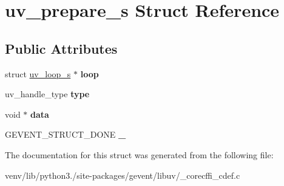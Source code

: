 \hypertarget{structuv__prepare__s}{}\section{uv\+\_\+prepare\+\_\+s Struct Reference}
\label{structuv__prepare__s}
\subsection*{Public Attributes}
\begin{DoxyCompactItemize}
\item 
\mbox{\label{structuv__prepare__s_ab44100172f6b14a4ebb412dd9de1247b}} 
struct \hyperlink{structuv__loop__s}{uv\+\_\+loop\+\_\+s} $\ast$ {\bfseries loop}
\item 
\mbox{\label{structuv__prepare__s_a4936404b86b21f6ed61f5c338cf9d91f}} 
uv\+\_\+handle\+\_\+type {\bfseries type}
\item 
\mbox{\label{structuv__prepare__s_a64899c7c653671ca317cc3c61b6530ff}} 
void $\ast$ {\bfseries data}
\item 
\mbox{\label{structuv__prepare__s_a01b77f0a3471638e9fb4041c6a0453cc}} 
G\+E\+V\+E\+N\+T\+\_\+\+S\+T\+R\+U\+C\+T\+\_\+\+D\+O\+NE {\bfseries \+\_\+}
\end{DoxyCompactItemize}


The documentation for this struct was generated from the following file\+:\begin{DoxyCompactItemize}
\item 
venv/lib/python3./site-\/packages/gevent/libuv/\+\_\+corecffi\+\_\+cdef.\+c\end{DoxyCompactItemize}
